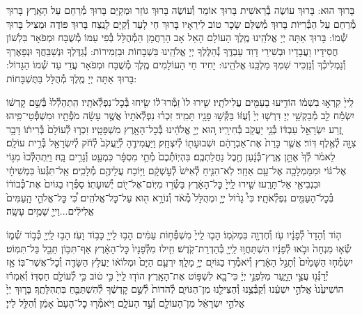 \documentclass[twoside, openany, parskip=half, 11pt]{book}
\begin{document}
בָּרוּךְ הוּא:
בָּרוּךְ עוֹשֶׂה בְ֯רֵאשִׁית בָּרוּךְ אוֹמֵר וְ֯עוֹשֶׂה
בָּרוּךְ גּוֹזֵר וּמְקַיֵּם בָּרוּךְ מְ֯רַחֵם עַל הָאָֽרֶץ
בָּרוּךְ מְ֯רַחֵם עַל הַבְּ֯רִיּוֹת בָּרוּךְ מְ֯שַׁלֵּם שָׂכָר טוֹב לִירֵאָיו
בָּרוּךְ חַי לָעַד וְ֯קַיָּם לָנֶֽצַח בָּרוּךְ פּוֹדֶה וּמַצִּיל בָּרוּךְ שְׁ֯מוֹ:
בָּרוּךְ אַתָּה יְיָ אֱלֹהֵֽינוּ מֶֽלֶךְ הָעוֹלָם הָאֵל אָב הָרַחֲמָן הַמְ֯הֻלָּל בְּ֯פִי עַמּוֹ מְ֯שֻׁבָּח וּמְפֹאָר בִּלְשׁוֹן חֲסִידָיו וַעֲבָדָיו וּבְשִׁירֵי דָוִד עַבְדֶּֽךָ נְ֯הַלֶּלְךָ יְיָ אֱלֹהֵֽינוּ בִּשְׁבָחוֹת וּבִזְמִירוֹת: נְ֯גַדֶּלְךָ וּנְשַׁבֵּחֲךָ וּנְפָאֶרְךָ וְ֯נַמְלִיכְ֯ךָ וְ֯נַזְכִּיר שִׁמְךָ מַלְכֵּֽנוּ אֱלֹהֵֽינוּ:
יָחִיד חֵי הָעוֹלָמִים מֶֽלֶךְ מְ֯שֻׁבָּח וּמְפֹאָר עֲדֵי עַד שְׁ֯מוֹ הַגָּדוֹל: בָּרוּךְ אַתָּה יְיָ מֶֽלֶךְ מְ֯הֻלָּל בַּתֻּשְׁבָּחוֹת:

לַֽייָ֙ קִרְא֣וּ בִשְׁמ֔וֹ
הוֹדִ֥יעוּ בָעַמִּ֖ים עֲלִילֹתָֽיו׃
שִׁ֤ירוּ לוֹ֙ זַמְּ֯רוּ־ל֔וֹ שִׂ֖יחוּ בְּ֯כׇל־נִפְלְ֯אֹתָֽיו׃
הִֽתְהַלְ֯לוּ֙ בְּ֯שֵׁ֣ם קׇדְשׁ֔וֹ יִשְׂמַ֕ח לֵ֖ב מְ֯בַקְשֵׁ֥י יְיָ׃
דִּרְשׁ֤וּ יְיָ֙ וְ֯עֻזּ֔וֹ בַּקְּ֯שׁ֥וּ פָנָ֖יו תָּמִֽיד׃
זִכְר֗וּ נִפְלְ֯אֹתָיו֙ אֲשֶׁ֣ר עָשָׂ֔ה מֹפְ֯תָ֖יו וּמִשְׁפְּ֯טֵי־פִֽיהוּ׃
זֶ֚רַע יִשְׂרָאֵ֣ל עַבְדּ֔וֹ בְּ֯נֵ֥י יַעֲקֹ֖ב בְּ֯חִירָֽיו׃
ה֚וּא יְיָ֣ אֱלֹהֵ֔ינוּ בְּ֯כׇל־הָאָ֖רֶץ מִשְׁפָּטָֽיו׃
זִכְר֤וּ לְ֯עוֹלָם֙ בְּ֯רִית֔וֹ דָּבָ֥ר צִוָּ֖ה לְ֯אֶ֥לֶף דּֽוֹר׃
אֲשֶׁ֤ר כָּרַת֙ אֶת־אַבְרָהָ֔ם וּשְׁבוּעָת֖וֹ לְ֯יִצְחָֽק׃
וַיַּעֲמִידֶ֤הָ לְ֯יַֽעֲקֹב֙ לְ֯חֹ֔ק לְ֯יִשְׂרָאֵ֖ל בְּ֯רִ֥ית עוֹלָֽם׃
לֵאמֹ֗ר לְ֯ךָ֙ אֶתֵּ֣ן אֶֽרֶץ־כְּ֯נָ֔עַן חֶ֖בֶל נַחֲלַתְכֶֽם׃
בִּהְיֽוֹתְ֯כֶם֙ מְ֯תֵ֣י מִסְפָּ֔ר כִּמְעַ֖ט וְ֯גָרִ֥ים בָּֽהּ׃
וַיִּֽתְהַלְּ֯כוּ֙ מִגּ֣וֹי אֶל־גּ֔וֹי וּמִמַּמְלָכָ֖ה אֶל־עַ֥ם אַחֵֽר׃
לֹֽא־הִנִּ֤יחַ לְ֯אִישׁ֙ לְ֯עׇשְׁקָ֔ם וַיּ֥וֹכַח עֲלֵיהֶ֖ם מְ֯לָכִֽים׃
אַֽל־תִּגְּ֯עוּ֙ בִּמְשִׁיחָ֔י וּבִנְבִיאַ֖י אַל־תָּרֵֽעוּ׃
שִׁ֤ירוּ לַֽייָ֙ כׇּל־הָאָ֔רֶץ בַּשְּׂ֯ר֥וּ מִיּֽוֹם־אֶל־י֖וֹם יְ֯שׁוּעָתֽוֹ׃
סַפְּ֯ר֤וּ בַגּוֹיִם֙ אֶת־כְּ֯בוֹד֔וֹ בְּ֯כׇל־הָעַמִּ֖ים נִפְלְ֯אֹתָֽיו׃
כִּי֩ גָד֨וֹל יְיָ֤ וּמְהֻלָּל֙ מְ֯אֹ֔ד וְ֯נוֹרָ֥א ה֖וּא עַל־כׇּל־אֱלֹהִֽים׃
כִּ֠י כׇּל־אֱלֹהֵ֤י הָֽעַמִּים֙ אֱלִילִ֔ים...וַייָ֖ שָׁמַ֥יִם עָשָֽׂה׃

ה֤וֹד וְ֯הָדָר֙ לְ֯פָנָ֔יו עֹ֥ז וְ֯חֶדְוָ֖ה בִּמְקֹמֽוֹ׃
הָב֤וּ לַֽייָ֙ מִשְׁפְּ֯ח֣וֹת עַמִּ֔ים הָב֥וּ לַייָ֖ כָּב֥וֹד וָעֹֽז׃
הָב֥וּ לַֽייָ֖ כְּ֯ב֣וֹד שְׁ֯מ֑וֹ שְׂ֯א֤וּ מִנְחָה֙ וּבֹ֣אוּ לְ֯פָנָ֔יו
הִשְׁתַּחֲו֥וּ לַֽייָ֖ בְּ֯הַדְרַת־קֹֽדֶשׁ׃ חִ֤ילוּ מִלְּ֯פָנָיו֙ כׇּל־הָאָ֔רֶץ
אַף־תִּכּ֥וֹן תֵּבֵ֖ל בַּל־תִּמּֽוֹט׃ יִשְׂמְ֯ח֤וּ הַשָּׁמַ֙יִם֙ וְ֯תָגֵ֣ל הָאָ֔רֶץ
וְ֯יֹאמְ֯ר֥וּ בַגּוֹיִ֖ם יְיָ֥ מָלָֽךְ׃ יִרְעַ֤ם הַיָּם֙ וּמְלוֹא֔וֹ
יַעֲלֹ֥ץ הַשָּׂדֶ֖ה וְ֯כׇל־אֲשֶׁר־בּֽוֹ׃ אָ֥ז יְ֯רַנְּ֯נ֖וּ עֲצֵ֣י הַיָּ֑עַר
מִלִּפְנֵ֣י יְיָ֔ כִּי־בָ֖א לִשְׁפּ֥וֹט אֶת־הָאָֽרֶץ׃ הוֹד֤וּ לַֽייָ֙ כִּ֣י ט֔וֹב
כִּ֥י לְ֯עוֹלָ֖ם חַסְדּֽוֹ׃ וְ֯אִמְר֕וּ הוֹשִׁיעֵ֙נוּ֙ אֱלֹהֵ֣י יִשְׁעֵ֔נוּ
וְ֯קַבְּ֯צֵ֥נוּ וְ֯הַצִּילֵ֖נוּ מִן־הַגּוֹיִ֑ם לְ֯הֹדוֹת֙ לְ֯שֵׁ֣ם קׇדְשֶׁ֔ךָ
לְ֯הִשְׁתַּבֵּ֖חַ בִּתְהִלָּתֶֽךָ׃ בָּר֤וּךְ יְיָ֙ אֱלֹהֵ֣י יִשְׂרָאֵ֔ל
מִן־הָעוֹלָ֖ם וְ֯עַ֣ד הָעֹלָ֑ם וַיֹּאמְ֯ר֤וּ כׇל־הָעָם֙ אָמֵ֔ן וְ֯הַלֵּ֖ל לַייָ׃\\
\end{document}
